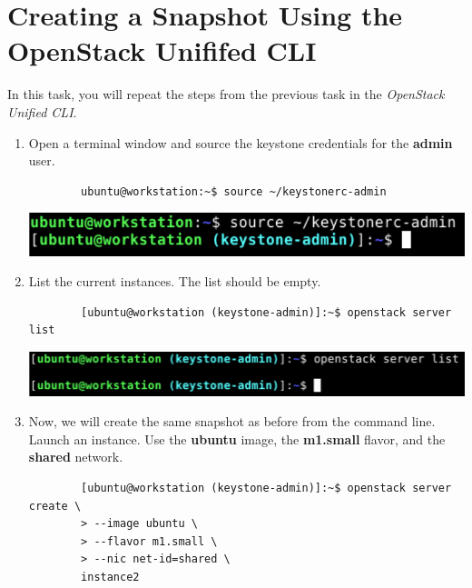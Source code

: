 \documentclass[letterpaper, 12pt]{article}
\begin{document}
\section{Creating a Snapshot Using the OpenStack Unififed CLI}
\label{sec:creating_a_snapshot_cli}
In this task, you will repeat the steps from the previous task in the \textit{OpenStack Unified CLI}.

\begin{enumerate}
    \item Open a terminal window and source the keystone credentials for the \textbf{admin} user.
    \begin{lstlisting}
        ubuntu@workstation:~$ source ~/keystonerc-admin
    \end{lstlisting}

    \begin{center}
        \includegraphics[width=\linewidth]{images/part2/step1.png}
    \end{center}

    \item List the current instances. The list should be empty.
    \begin{lstlisting}
        [ubuntu@workstation (keystone-admin)]:~$ openstack server list
    \end{lstlisting}

    \begin{center}
        \includegraphics[width=\linewidth]{images/part2/step2.png}
    \end{center}

    \item Now, we will create the same snapshot as before from the command line. Launch an instance. Use the
    \textbf{ubuntu} image, the \textbf{m1.small} flavor, and the \textbf{shared} network.
    \begin{lstlisting}
        [ubuntu@workstation (keystone-admin)]:~$ openstack server create \
        > --image ubuntu \
        > --flavor m1.small \
        > --nic net-id=shared \
        instance2
    \end{lstlisting}


\end{enumerate}
\end{document}
